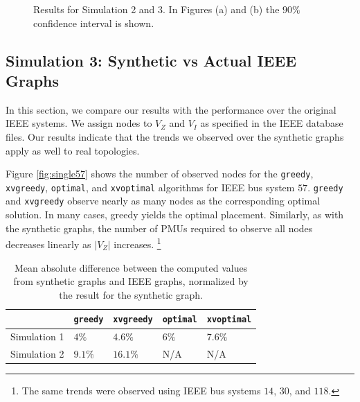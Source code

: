 {\begin{figure}[t]
\begin{center}
  \end{center}
	\caption{Results for Simulation 2 and 3. In Figures (a) and (b) the $90\%$ confidence interval is shown. }
  \label{fig:sim23}
\end{figure}


\subsection{Simulation 3: Synthetic vs Actual IEEE Graphs}
\label{subsec:ieee}
In this section, we compare our results with the performance over the original IEEE systems. 
We assign nodes to $V_Z$ and $V_I$ as specified in the IEEE database files. Our results indicate that the trends we observed over the synthetic graphs apply as well to real topologies.


Figure \ref{fig:single57} shows the number of observed nodes for the {\tt greedy},  {\tt xvgreedy}, {\tt optimal},  and {\tt xvoptimal} algorithms %
for IEEE bus system $57$. {\tt greedy} and {\tt xvgreedy} observe nearly as many nodes as the corresponding optimal solution.
In many cases, greedy yields the optimal placement. %
Similarly, as with the synthetic graphs, the number of PMUs required to observe all nodes decreases linearly as $|V_Z|$ increases.
{\footnote {\small The same trends were observed using IEEE bus systems $14$, $30$, and $118$.}}

\begin{table}
\begin{center}
\begin{tabular}{|l|l|l|l|l|}
\hline
 &  {\tt greedy} & {\tt xvgreedy}  & {\tt optimal} & {\tt xvoptimal}  \\
\hline \hline
Simulation 1  & $4\%$  & $4.6\%$ & $6\%$ & $7.6\%$  \\
\hline
Simulation 2 & $9.1\%$ & $16.1\%$ & N/A  & N/A  \\
\hline
\end{tabular}
\end{center}
\caption{Mean absolute difference between the computed values from synthetic graphs and IEEE graphs, normalized by the result for the synthetic graph.}
\label{tab:diff}
\end{table}

}
